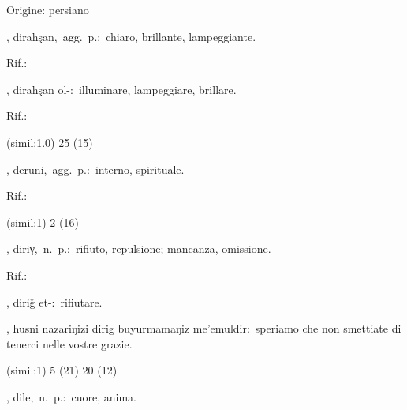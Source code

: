 \begin{glossario}{Origine: persiano}
\begin{subvocedue}
\begin{subvocedue}
\end{subvocedue}
\end{subvocedue}
\item[{\color{colorlowref}\spzrl{dira_h^sAn}},] {\sf dirahşan},\ agg.\ p.:\ chiaro, brillante, lampeggiante.
\begin{subvocedue}
\item[Rif.:] 
\end{subvocedue}
\begin{subvocedue}
\item[\subglossariobullet] , {\sf dirahşan ol-}:\ illuminare, lampeggiare, brillare.
\begin{subvocedue}
\item[Rif.:] 
\end{subvocedue}
\item[(simil:1.0)]   25 (15)
\end{subvocedue}
\item[{\color{colorlowref}\spzrl{darUnI}},] {\sf deruni},\ agg.\ p.:\ interno, spirituale.
\begin{subvocedue}
\item[Rif.:] 
\end{subvocedue}
\begin{subvocedue}
\item[(simil:1)]   2 (16)
\end{subvocedue}
\item[{\color{colorlowref}\spzrl{dirI.g}},] {\sf diriγ},\ n.\ p.:\ rifiuto, repulsione; mancanza, omissione.
\begin{subvocedue}
\item[Rif.:] 
\end{subvocedue}
\begin{subvocedue}
\item[\subglossariobullet] , {\sf diriğ et-}:\ rifiutare.
\item[\subglossariobullet] , {\sf husni nazariŋizi dirig buyurmamaŋiz me'emuldir}:\ speriamo che non smettiate di tenerci nelle vostre grazie.
\item[(simil:1)]   5 (21) 20 (12)
\end{subvocedue}
\item[{\color{colorlowref}\spzrl{dil.H}},] {\sf dile},\ n.\ p.:\ cuore, anima.
\begin{subvocedue}

\end{subvocedue}
\end{glossario}
